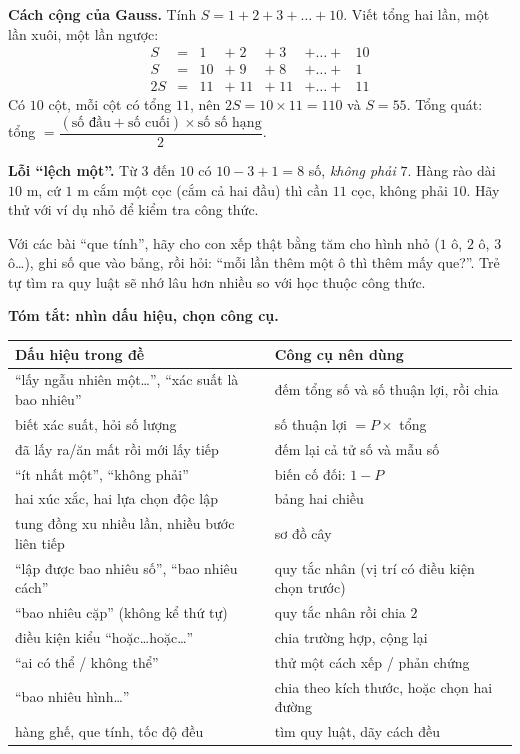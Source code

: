 \begin{proofbox}
\textbf{Cách cộng của Gauss.} Tính $S=1+2+3+\dots+10$. Viết tổng hai lần, một lần xuôi, một lần ngược:
\[
\begin{array}{rcccccc}
S&=&1&+\;2&+\;3&+\dots+&10\\
S&=&10&+\;9&+\;8&+\dots+&1\\ \hline
2S&=&11&+\;11&+\;11&+\dots+&11
\end{array}
\]
Có $10$ cột, mỗi cột có tổng $11$, nên $2S=10\times11=110$ và $S=55$. Tổng quát: tổng $=\dfrac{(\text{số đầu}+\text{số cuối})\times\text{số số hạng}}{2}$.
\end{proofbox}

\begin{warnbox}
\textbf{Lỗi ``lệch một''.} Từ $3$ đến $10$ có $10-3+1=8$ số, \emph{không phải} $7$. Hàng rào dài $10$ m, cứ $1$ m cắm một cọc (cắm cả hai đầu) thì cần $11$ cọc, không phải $10$. Hãy thử với ví dụ nhỏ để kiểm tra công thức.
\end{warnbox}

\begin{parentbox}
Với các bài ``que tính'', hãy cho con xếp thật bằng tăm cho hình nhỏ ($1$ ô, $2$ ô, $3$ ô\ldots), ghi số que vào bảng, rồi hỏi: ``mỗi lần thêm một ô thì thêm mấy que?''. Trẻ tự tìm ra quy luật sẽ nhớ lâu hơn nhiều so với học thuộc công thức.
\end{parentbox}

\begin{knowbox}
\textbf{Tóm tắt: nhìn dấu hiệu, chọn công cụ.}\par\smallskip
\begin{tabularx}{\linewidth}{@{}>{\raggedright\arraybackslash}X>{\raggedright\arraybackslash}X@{}}
\textbf{Dấu hiệu trong đề} & \textbf{Công cụ nên dùng}\\ \hline
``lấy ngẫu nhiên một\ldots'', ``xác suất là bao nhiêu'' & đếm tổng số và số thuận lợi, rồi chia\\
biết xác suất, hỏi số lượng & số thuận lợi $=P\times$ tổng\\
đã lấy ra/ăn mất rồi mới lấy tiếp & đếm lại cả tử số và mẫu số\\
``ít nhất một'', ``không phải'' & biến cố đối: $1-P$\\
hai xúc xắc, hai lựa chọn độc lập & bảng hai chiều\\
tung đồng xu nhiều lần, nhiều bước liên tiếp & sơ đồ cây\\
``lập được bao nhiêu số'', ``bao nhiêu cách'' & quy tắc nhân (vị trí có điều kiện chọn trước)\\
``bao nhiêu cặp'' (không kể thứ tự) & quy tắc nhân rồi chia $2$\\
điều kiện kiểu ``hoặc\ldots hoặc\ldots'' & chia trường hợp, cộng lại\\
``ai có thể / không thể'' & thử một cách xếp / phản chứng\\
``bao nhiêu hình\ldots'' & chia theo kích thước, hoặc chọn hai đường\\
hàng ghế, que tính, tốc độ đều & tìm quy luật, dãy cách đều\\
\end{tabularx}
\end{knowbox}

